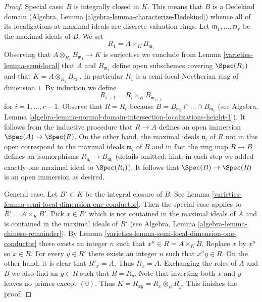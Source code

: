 \begin{proof}

Special case: $B$ is integrally closed in $K$. This means that
$B$ is a Dedekind domain
(Algebra, Lemma \ref{algebra-lemma-characterize-Dedekind})
whence all of its localizations at maximal ideals are discrete valuation rings.
Let $\mathfrak m_1, \ldots, \mathfrak m_r$ be the maximal ideals of
$B$. We set
$$
R_1 = A \times_K B_{\mathfrak m_1}
$$
Observing that $A \otimes_{R_1} B_{\mathfrak m_1} \to K$ is surjective
we conclude from Lemma \ref{varieties-lemma-semi-local} that $A$ and
$B_{\mathfrak m_1}$ define open subschemes covering $\Spec(R_1)$ and that
$K = A \otimes_{R_1} B_{\mathfrak m_1}$. In particular $R_1$ is a
semi-local Noetherian ring of dimension $1$. By induction we define
$$
R_{i + 1} = R_i \times_K B_{\mathfrak m_{i + 1}}
$$
for $i = 1, \ldots, r - 1$. Observe that $R = R_r$ because
$B = B_{\mathfrak m_1} \cap \ldots \cap B_{\mathfrak m_r}$ (see
Algebra, Lemma
\ref{algebra-lemma-normal-domain-intersection-localizations-height-1}).
It follows from the inductive procedure that $R \to A$ defines an
open immersion $\Spec(A) \to \Spec(R)$. On the other hand, the
maximal ideals $\mathfrak n_i$ of $R$ not in this open correspond
to the maximal ideals $\mathfrak m_i$ of $B$ and in fact
the ring map $R \to B$ defines an isomorphisms
$R_{\mathfrak n_i} \to B_{\mathfrak m_i}$ (details omitted; hint:
in each step we added exactly one maximal ideal to $\Spec(R_i)$).
It follows that $\Spec(B) \to \Spec(R)$ is an open immersion
as desired.

\medskip\noindent
General case. Let $B' \subset K$ be the integral closure of $B$.
See Lemma \ref{varieties-lemma-semi-local-dimension-one-conductor}.
Then the special case applies to $R' = A \times_K B'$.
Pick $x \in R'$ which is not contained in the maximal
ideals of $A$ and is contained in the maximal ideals of $B'$
(see Algebra, Lemma \ref{algebra-lemma-chinese-remainder}).
By Lemma \ref{varieties-lemma-semi-local-dimension-one-conductor}
there exists an integer $n$ such that $x^n \in R = A \times_K B$.
Replace $x$ by $x^n$ so $x \in R$. For every $y \in R'$ there exists
an integer $n$ such that $x^n y \in R$. On the other hand,
it is clear that $R'_x = A$. Thus $R_x = A$.
Exchanging the roles of $A$ and $B$ we also find an $y \in R$
such that $B = R_y$. Note that inverting both $x$ and $y$
leaves no primes except $(0)$. Thus $K = R_{xy} = R_x \otimes_R R_y$.
This finishes the proof.
\end{proof}

